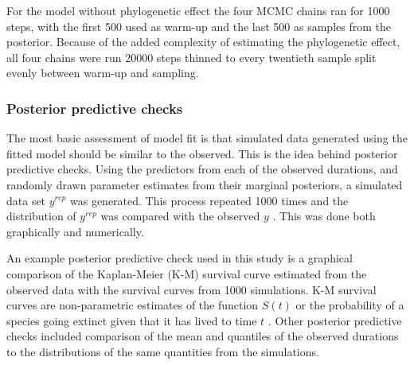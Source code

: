 \documentclass[12pt,letterpaper]{article}
\begin{document}
For the model without phylogenetic effect the four MCMC chains ran for 1000 steps, with the first 500 used as warm-up and the last 500 as samples from the posterior. Because of the added complexity of estimating the phylogenetic effect, all four chains were run 20000 steps thinned to every twentieth sample split evenly between warm-up and sampling. 



\subsubsection{Posterior predictive checks}

The most basic assessment of model fit is that simulated data generated using the fitted model should be similar to the observed. This is the idea behind posterior predictive checks. Using the predictors from each of the observed durations, and randomly drawn parameter estimates from their marginal posteriors, a simulated data set \(y^{rep}\) was generated. This process repeated 1000 times and the distribution of \(y^{rep}\) was compared with the observed \(y\) \citep{Gelman2013d}. This was done both graphically and numerically.

An example posterior predictive check used in this study is a graphical comparison of the Kaplan-Meier (K-M) survival curve estimated from the observed data with the survival curves from 1000 simulations. K-M survival curves are non-parametric estimates of the function \(S(t)\) or the probability of a species going extinct given that it has lived to time \(t\) \citep{Kleinbaum2005}. Other posterior predictive checks included comparison of the mean and quantiles of the observed durations to the distributions of the same quantities from the simulations.
\end{document}
